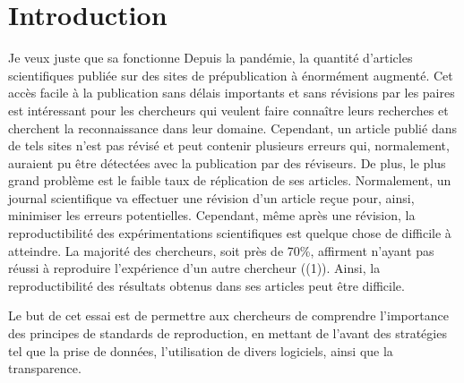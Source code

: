 \documentclass[9pt,twocolumn,twoside,]{pnas-new}
\title{}
\author[a]{Laura Béland}
\affil[a]{Université de Sherbrooke, Départment de biologie, 2500
Boulevard de l'Université, Sherbrooke, Québec, J1K 2R1}
\begin{document}
\verticaladjustment{-2pt}



\maketitle
\thispagestyle{firststyle}


\acknow{}

\hypertarget{introduction}{%
\section{Introduction}\label{introduction}}

Je veux juste que sa fonctionne Depuis la pandémie, la quantité
d'articles scientifiques publiée sur des sites de prépublication à
énormément augmenté. Cet accès facile à la publication sans délais
importants et sans révisions par les paires est intéressant pour les
chercheurs qui veulent faire connaître leurs recherches et cherchent la
reconnaissance dans leur domaine. Cependant, un article publié dans de
tels sites n'est pas révisé et peut contenir plusieurs erreurs qui,
normalement, auraient pu être détectées avec la publication par des
réviseurs. De plus, le plus grand problème est le faible taux de
réplication de ses articles. Normalement, un journal scientifique va
effectuer une révision d'un article reçue pour, ainsi, minimiser les
erreurs potentielles. Cependant, même après une révision, la
reproductibilité des expérimentations scientifiques est quelque chose de
difficile à atteindre. La majorité des chercheurs, soit près de 70\%,
affirment n'ayant pas réussi à reproduire l'expérience d'un autre
chercheur ((1)). Ainsi, la reproductibilité des résultats obtenus dans
ses articles peut être difficile.

Le but de cet essai est de permettre aux chercheurs de comprendre
l'importance des principes de standards de reproduction, en mettant de
l'avant des stratégies tel que la prise de données, l'utilisation de
divers logiciels, ainsi que la transparence.
\end{document}
